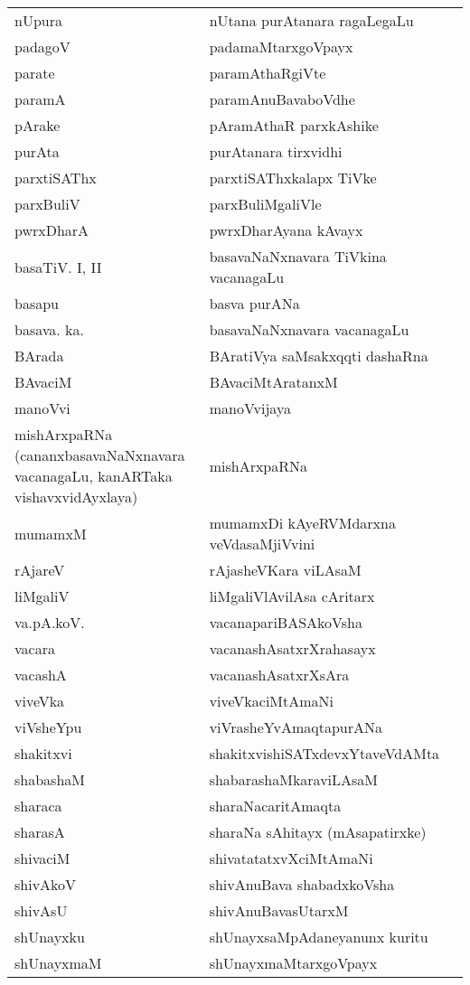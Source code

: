 {\begin{longtable}{>{\raggedright}p{3.5cm}ll}
nUpura & nUtana purAtanara ragaLegaLu & \\
padagoV & padamaMtarxgoVpayx & \\
parate & paramAthaRgiVte & \\
paramA & paramAnuBavaboVdhe & \\
pArake & pAramAthaR parxkAshike & \\
purAta & purAtanara tirxvidhi & \\
parxtiSAThx & parxtiSAThxkalapx TiVke &\\
parxBuliV & parxBuliMgaliVle & \\
pwrxDharA & pwrxDharAyana kAvayx & \\
basaTiV. {\rm I, II} & basavaNaNxnavara TiVkina vacanagaLu & \\
basapu & basva purANa & \\
basava. ka. & basavaNaNxnavara vacanagaLu & \\
BArada & BAratiVya saMsakxqqti dashaRna & \\
BAvaciM & BAvaciMtAratanxM & \\
manoVvi & manoVvijaya & \\
mishArxpaRNa (cananxbasavaNaNxnavara vacanagaLu, kanARTaka vishavxvidAyxlaya) & mishArxpaRNa &\\
mumamxM & mumamxDi kAyeRVMdarxna veVdasaMjiVvini & \\
rAjareV & rAjasheVKara viLAsaM & \\
liMgaliV & liMgaliVlAvilAsa cAritarx & \\
va.pA.koV. & vacanapariBASAkoVsha & \\
vacara & vacanashAsatxrXrahasayx & \\
vacashA & vacanashAsatxrXsAra & \\
viveVka & viveVkaciMtAmaNi & \\
viVsheYpu & viVrasheYvAmaqtapurANa & \\
shakitxvi & shakitxvishiSATxdevxYtaveVdAMta & \\
shabashaM & shabarashaMkaraviLAsaM & \\
sharaca & sharaNacaritAmaqta & \\
sharasA & sharaNa sAhitayx (mAsapatirxke) & \\
shivaciM & shivatatatxvXciMtAmaNi & \\
shivAkoV & shivAnuBava shabadxkoVsha & \\
shivAsU & shivAnuBavasUtarxM & \\
shUnayxku & shUnayxsaMpAdaneyanunx kuritu &\\
shUnayxmaM & shUnayxmaMtarxgoVpayx & \\

\end{longtable}}
